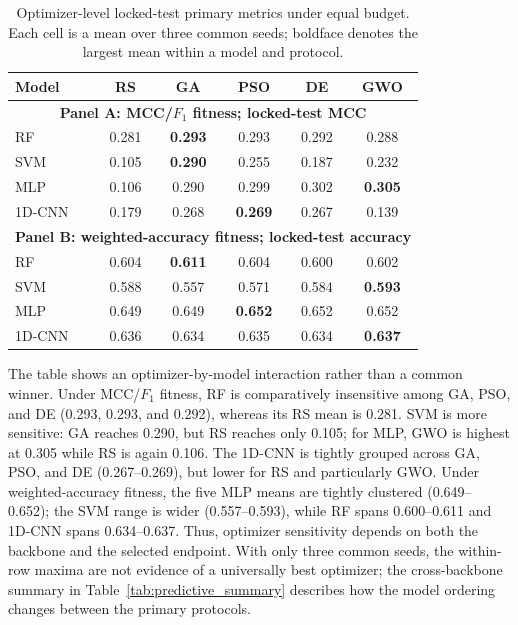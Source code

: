 \begin{table}[htbp]
\centering
\caption{Optimizer-level locked-test primary metrics under equal budget. Each cell is a mean over three common seeds; boldface denotes the largest mean within a model and protocol.}
\label{tab:optimizer_primary_metrics}
\manuscripttablestyle
\begin{tabular}{lccccc}\toprule
\textbf{Model} & \textbf{RS} & \textbf{GA} & \textbf{PSO} & \textbf{DE} & \textbf{GWO}\\\midrule
\multicolumn{6}{c}{\textbf{Panel A: MCC/$F_1$ fitness; locked-test MCC}}\\\midrule
RF & 0.281 & \textbf{0.293} & 0.293 & 0.292 & 0.288\\
SVM & 0.105 & \textbf{0.290} & 0.255 & 0.187 & 0.232\\
MLP & 0.106 & 0.290 & 0.299 & 0.302 & \textbf{0.305}\\
1D-CNN & 0.179 & 0.268 & \textbf{0.269} & 0.267 & 0.139\\\midrule
\multicolumn{6}{c}{\textbf{Panel B: weighted-accuracy fitness; locked-test accuracy}}\\\midrule
RF & 0.604 & \textbf{0.611} & 0.604 & 0.600 & 0.602\\
SVM & 0.588 & 0.557 & 0.571 & 0.584 & \textbf{0.593}\\
MLP & 0.649 & 0.649 & \textbf{0.652} & 0.652 & 0.652\\
1D-CNN & 0.636 & 0.634 & 0.635 & 0.634 & \textbf{0.637}\\\bottomrule
\end{tabular}
\end{table}

The table shows an optimizer-by-model interaction rather than a common winner. Under MCC/$F_1$ fitness, RF is comparatively insensitive among GA, PSO, and DE (0.293, 0.293, and 0.292), whereas its RS mean is 0.281. SVM is more sensitive: GA reaches 0.290, but RS reaches only 0.105; for MLP, GWO is highest at 0.305 while RS is again 0.106. The 1D-CNN is tightly grouped across GA, PSO, and DE (0.267--0.269), but lower for RS and particularly GWO. Under weighted-accuracy fitness, the five MLP means are tightly clustered (0.649--0.652); the SVM range is wider (0.557--0.593), while RF spans 0.600--0.611 and 1D-CNN spans 0.634--0.637. Thus, optimizer sensitivity depends on both the backbone and the selected endpoint. With only three common seeds, the within-row maxima are not evidence of a universally best optimizer; the cross-backbone summary in Table~\ref{tab:predictive_summary} describes how the model ordering changes between the primary protocols.

